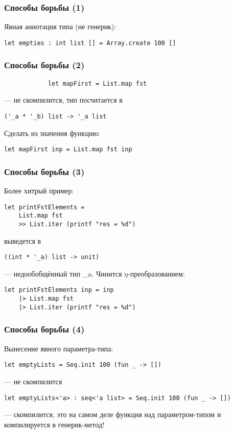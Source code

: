 \documentclass{../../slides-style}
\begin{document}
    \begin{frame}[fragile]
        \frametitle{Способы борьбы (1)}
        Явная аннотация типа (не генерик):
        \begin{verbatim}
let empties : int list [] = Array.create 100 []
        \end{verbatim}
    \end{frame}

    \begin{frame}[fragile]
        \frametitle{Способы борьбы (2)}
        \begin{verbatim}
            let mapFirst = List.map fst
        \end{verbatim}
        --- не скомпилится, тип посчитается в 
        \begin{verbatim}
('_a * '_b) list -> '_a list
        \end{verbatim}

        \vspace{5mm}

        Сделать из значения функцию:
        \begin{verbatim}
let mapFirst inp = List.map fst inp
        \end{verbatim}
    \end{frame}

    \begin{frame}[fragile]
        \frametitle{Способы борьбы (3)}
        Более хитрый пример:
        \begin{verbatim}
let printFstElements = 
    List.map fst
    >> List.iter (printf "res = %d")
        \end{verbatim}
        выведется в 
        \begin{verbatim}
((int * '_a) list -> unit)    
        \end{verbatim}
        --- недообобщённый тип \_a. Чинится $\eta$-преобразованием:
        \begin{verbatim}
let printFstElements inp = inp
    |> List.map fst
    |> List.iter (printf "res = %d")
        \end{verbatim}
    \end{frame}

    \begin{frame}[fragile]
        \frametitle{Способы борьбы (4)}
        Вынесение явного параметра-типа:
        \begin{verbatim}
let emptyLists = Seq.init 100 (fun _ -> [])
        \end{verbatim}
        --- не скомпилится
        \vspace{5mm}
        \begin{verbatim}
let emptyLists<'a> : seq<'a list> = Seq.init 100 (fun _ -> [])
        \end{verbatim}
        --- скомпилится, это на самом деле функция над параметром-типом и компилируется в генерик-метод!
    \end{frame}
\end{document}
